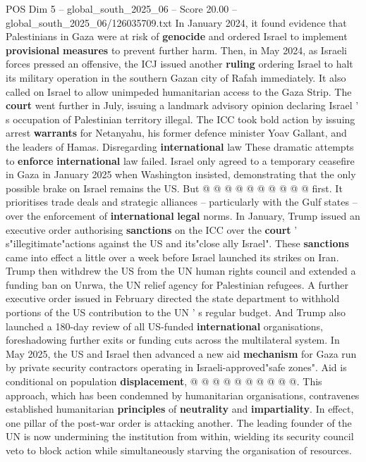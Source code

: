 \begin{textsample}{POS Dim 5 – global\_south\_2025\_06 – Score 20.00 – global\_south\_2025\_06/126035709.txt}
In January 2024, it found evidence that Palestinians in Gaza were at risk of \textbf{genocide} and ordered Israel to implement \textbf{provisional} \textbf{measures} to prevent further harm.
Then, in May 2024, as Israeli forces pressed an offensive, the ICJ issued another \textbf{ruling} ordering Israel to halt its military operation in the southern Gazan city of Rafah immediately.
It also called on Israel to allow unimpeded humanitarian access to the Gaza Strip.
The \textbf{court} went further in July, issuing a landmark advisory opinion declaring Israel ' s occupation of Palestinian territory illegal.
The ICC took bold action by issuing arrest \textbf{warrants} for Netanyahu, his former defence minister Yoav Gallant, and the leaders of Hamas.
Disregarding \textbf{international} law These dramatic attempts to \textbf{enforce} \textbf{international} law failed.
Israel only agreed to a temporary ceasefire in Gaza in January 2025 when Washington insisted, demonstrating that the only possible brake on Israel remains the US.
But @ @ @ @ @ @ @ @ @ @ first.
It prioritises trade deals and strategic alliances -- particularly with the Gulf states -- over the enforcement of \textbf{international} \textbf{legal} norms.
In January, Trump issued an executive order authorising \textbf{sanctions} on the ICC over the \textbf{court} ' s"illegitimate"actions against the US and its"close ally Israel".
These \textbf{sanctions} came into effect a little over a week before Israel launched its strikes on Iran.
Trump then withdrew the US from the UN human rights council and extended a funding ban on Unrwa, the UN relief agency for Palestinian refugees.
A further executive order issued in February directed the state department to withhold portions of the US contribution to the UN ' s regular budget.
And Trump also launched a 180-day review of all US-funded \textbf{international} organisations, foreshadowing further exits or funding cuts across the multilateral system.
In May 2025, the US and Israel then advanced a new aid \textbf{mechanism} for Gaza run by private security contractors operating in Israeli-approved"safe zones".
Aid is conditional on population \textbf{displacement}, @ @ @ @ @ @ @ @ @ @.
This approach, which has been condemned by humanitarian organisations, contravenes established humanitarian \textbf{principles} of \textbf{neutrality} and \textbf{impartiality}.
In effect, one pillar of the post-war order is attacking another.
The leading founder of the UN is now undermining the institution from within, wielding its security council veto to block action while simultaneously starving the organisation of resources.

\end{textsample}
